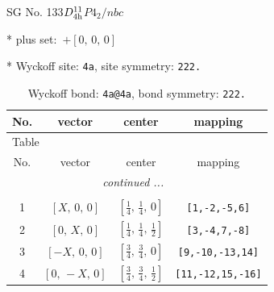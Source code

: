 \documentclass[fleqn,8pt]{jsarticle}
\begin{document}
\setcounter{MaxMatrixCols}{32}

\renewcommand{\tablename}{Table~}
\renewcommand{\figurename}{Figure~}
\begin{center}
\LARGE
SG No. 133\quad$D_{\rm 4h}^{11}$\quad$P4_2/nbc$\quad[ tetragonal ]
\end{center}

* plus set:\,\,\,$+\left[ 0,\, 0,\, 0 \right]$


* Wyckoff site: {\tt 4a}, site symmetry: {\tt 222.}
\renewcommand{\arraystretch}{1.2}
\begin{longtable}{cccc}
\caption{Wyckoff bond: {\tt 4a@4a}, bond symmetry: {\tt 222.}}
 \\
 \hline \hline
No. & vector & center & mapping \\ \hline \endfirsthead

\multicolumn{3}{l}{\tablename\ \thetable{}} \\
 \hline \hline
No. & vector & center & mapping \\ \hline \endhead

 \hline \hline
\multicolumn{3}{r}{\footnotesize\it continued ...} \\ \endfoot

 \hline \hline
\multicolumn{3}{r}{} \\ \endlastfoot

1 & $\left[ X,\, 0,\, 0 \right]$ & $\left[ \frac{1}{4},\, \frac{1}{4},\, 0 \right]$ & {\tt [1,-2,-5,6]} \\ \hline
2 & $\left[ 0,\, X,\, 0 \right]$ & $\left[ \frac{1}{4},\, \frac{1}{4},\, \frac{1}{2} \right]$ & {\tt [3,-4,7,-8]} \\ \hline
3 & $\left[ - X,\, 0,\, 0 \right]$ & $\left[ \frac{3}{4},\, \frac{3}{4},\, 0 \right]$ & {\tt [9,-10,-13,14]} \\ \hline
4 & $\left[ 0,\, - X,\, 0 \right]$ & $\left[ \frac{3}{4},\, \frac{3}{4},\, \frac{1}{2} \right]$ & {\tt [11,-12,15,-16]} \\
\end{longtable}
\renewcommand{\arraystretch}{1.2}
\end{document}
